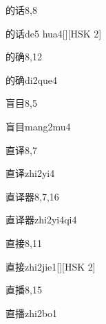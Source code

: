\begin{entry}{的话}{8,8}
  \begin{phonetics}{的话}{de5 hua4}[][HSK 2]
  \end{phonetics}
\end{entry}

\begin{entry}{的确}{8,12}
  \begin{phonetics}{的确}{di2que4}
  \end{phonetics}
\end{entry}

\begin{entry}{盲目}{8,5}
  \begin{phonetics}{盲目}{mang2mu4}
  \end{phonetics}
\end{entry}

\begin{entry}{直译}{8,7}
  \begin{phonetics}{直译}{zhi2yi4}
  \end{phonetics}
\end{entry}

\begin{entry}{直译器}{8,7,16}
  \begin{phonetics}{直译器}{zhi2yi4qi4}
  \end{phonetics}
\end{entry}

\begin{entry}{直接}{8,11}
  \begin{phonetics}{直接}{zhi2jie1}[][HSK 2]
  \end{phonetics}
\end{entry}

\begin{entry}{直播}{8,15}
  \begin{phonetics}{直播}{zhi2bo1}
  \end{phonetics}
\end{entry}

